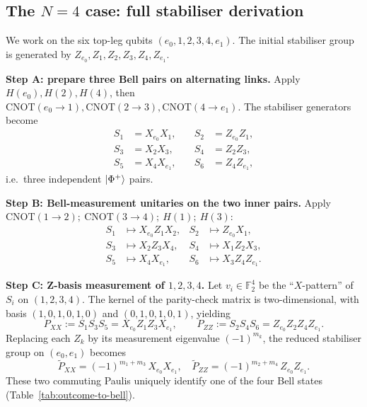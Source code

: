 \documentclass[11pt,a4paper]{article}
\theoremstyle{definition}
\newcommand{\Phip}{\ket{\Phi^+}}
\newcommand{\CNOT}{\mathrm{CNOT}}
\newcommand{\F}{\mathbb{F}}
\begin{document}
\subsection{The $N=4$ case: full stabiliser derivation}
\label{sec:N4}

We work on the six top-leg qubits $(e_0,1,2,3,4,e_1)$. The initial
stabiliser group is generated by $Z_{e_0},Z_1,Z_2,Z_3,Z_4,Z_{e_1}$.

\textbf{Step A: prepare three Bell pairs on alternating links.}
Apply $H(e_0),H(2),H(4)$, then $\CNOT(e_0\to 1),\CNOT(2\to 3),\CNOT(4\to e_1)$.
The stabiliser generators become
\begin{equation}
  \begin{aligned}
    S_1 &= X_{e_0}X_1,&\quad S_2 &= Z_{e_0}Z_1,\\
    S_3 &= X_2X_3,&\quad S_4 &= Z_2Z_3,\\
    S_5 &= X_4X_{e_1},&\quad S_6 &= Z_4Z_{e_1},
  \end{aligned}
\end{equation}
i.e.\ three independent $\Phip$ pairs.

\textbf{Step B: Bell-measurement unitaries on the two inner pairs.}
Apply $\CNOT(1\to 2);\ \CNOT(3\to 4);\ H(1);\ H(3)$:
\begin{equation}
  \begin{aligned}
    S_1 &\mapsto X_{e_0}Z_1X_2, & S_2 &\mapsto Z_{e_0}X_1, \\
    S_3 &\mapsto X_2Z_3X_4, & S_4 &\mapsto X_1Z_2X_3, \\
    S_5 &\mapsto X_4X_{e_1}, & S_6 &\mapsto X_3Z_4Z_{e_1}.
  \end{aligned}
\end{equation}

\textbf{Step C: Z-basis measurement of $1,2,3,4$.}
Let $v_i\in\F_2^{4}$ be the ``$X$-pattern'' of $S_i$ on $(1,2,3,4)$.
The kernel of the parity-check matrix is two-dimensional, with basis
$(1,0,1,0,1,0)$ and $(0,1,0,1,0,1)$, yielding
\begin{equation}
  P_{XX} := S_1 S_3 S_5 = X_{e_0}Z_1Z_3 X_{e_1},\qquad
  P_{ZZ} := S_2 S_4 S_6 = Z_{e_0}Z_2Z_4 Z_{e_1}.
\end{equation}
Replacing each $Z_k$ by its measurement eigenvalue $(-1)^{m_k}$, the
reduced stabiliser group on $(e_0,e_1)$ becomes
\begin{equation}
\boxed{\;
  \tilde P_{XX} = (-1)^{m_1+m_3}\, X_{e_0}X_{e_1},\quad
  \tilde P_{ZZ} = (-1)^{m_2+m_4}\, Z_{e_0}Z_{e_1}.\;}
\label{eq:N4-stabilisers}
\end{equation}
These two commuting Paulis uniquely identify one of the four Bell
states (Table~\ref{tab:outcome-to-bell}).
\end{document}
